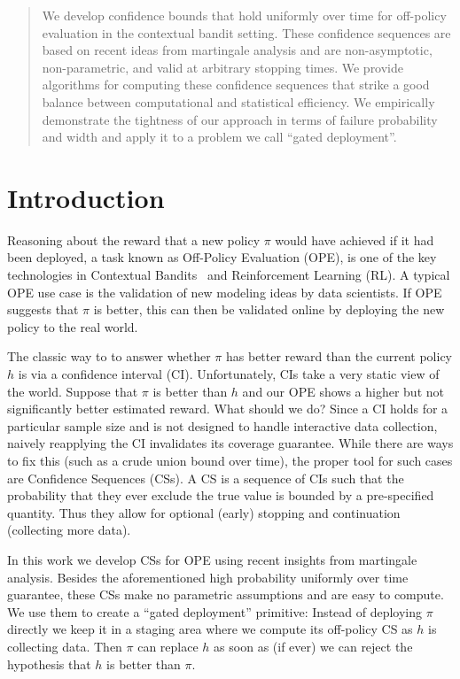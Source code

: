 \begin{abstract}
	We develop confidence bounds that hold uniformly over time for off-policy
	evaluation in the contextual bandit setting. These confidence sequences
	are based on recent ideas from martingale analysis and are
	non-asymptotic, non-parametric, and valid at arbitrary stopping times.
	We provide algorithms for computing these confidence sequences that
	strike a good balance between computational and statistical efficiency.
	We empirically demonstrate the tightness of our approach in terms of
	failure probability and width and apply it to a problem we call 
	``gated deployment''.
\end{abstract}

\section{Introduction} 
Reasoning about the reward that a new policy $\pi$ would have achieved if it
had been deployed, a task known as Off-Policy Evaluation (OPE), is one of the
key technologies in Contextual Bandits~\cite{epochgreedy} and Reinforcement
Learning (RL).  A typical OPE use case is the validation of new modeling ideas
by data scientists. If OPE suggests that $\pi$ is better, this can then be
validated online by deploying the new policy to the real world.

The classic way to to answer whether $\pi$ has better reward than the current
policy $h$ is via a confidence interval (CI).  Unfortunately, CIs take a very
static view of the world.  Suppose that $\pi$ is better than $h$ and our OPE
shows a higher but not significantly better estimated reward. What should we
do? Since a CI holds for a particular sample size and is not designed to handle
interactive data collection, naively reapplying the CI invalidates its coverage
guarantee. While there are ways to fix this (such as a crude union bound over
time), the proper tool for such cases are Confidence Sequences (CSs). A CS is a
sequence of CIs such that the probability that they ever exclude the true value
is bounded by a pre-specified quantity.  Thus they allow for optional (early)
stopping and continuation (collecting more data).

In this work we develop CSs for OPE using recent insights from martingale
analysis.  Besides the aforementioned high probability uniformly over time
guarantee, these CSs make no parametric assumptions and are easy to compute.
We use them to create a ``gated deployment'' primitive: Instead of deploying
$\pi$ directly we keep it in a staging area where we compute its off-policy CS
as $h$ is collecting data.  Then $\pi$ can replace $h$ as soon as (if ever) we
can reject the hypothesis that $h$ is better than $\pi$.


